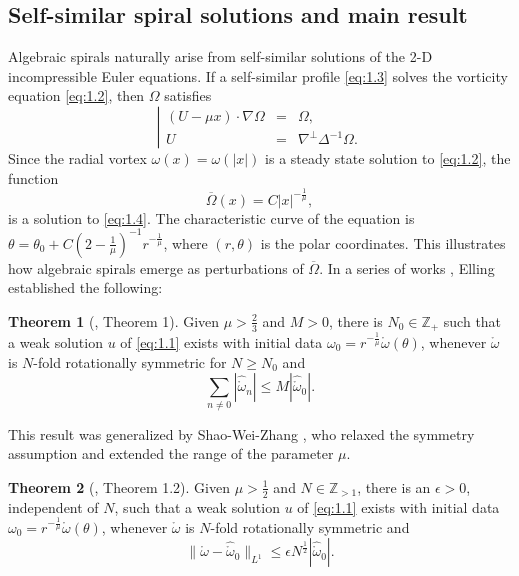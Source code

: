 \documentclass[11pt]{article}
\theoremstyle{definition}
\newtheorem{theorem}{Theorem}[section]
\theoremstyle{remark}
\numberwithin{equation}{section}
\newcommand{\mbb}{\mathbb}
\renewcommand{\hat}{\widehat}
\renewcommand{\bar}{\overline}
\newcommand{\grad}{\nabla}
\newcommand{\norm}[1]{\lVert #1 \rVert}
\begin{document}
\subsection{Self-similar spiral solutions and main result}
Algebraic spirals naturally arise from self-similar solutions of the 2-D incompressible Euler equations. If a self-similar profile \eqref{eq:1.3} solves the vorticity equation \eqref{eq:1.2}, then $\Omega$ satisfies
\begin{equation} \label{eq:1.4}
\left\vert \begin{array}{rcl} (U - \mu x) \cdot \grad \Omega &=& \Omega, \\ U &=&\grad^\perp \Delta^{-1}\Omega. \end{array} \right.
\end{equation}
Since the radial vortex $\omega(x) = \omega(|x|)$ is a steady state solution to \eqref{eq:1.2}, the function
\begin{equation*}
\bar{\Omega}(x) = C |x|^{-\frac{1}{\mu}},
\end{equation*}
is a solution to \eqref{eq:1.4}. The characteristic curve of the equation is $\theta = \theta_0 + C(2 - \frac{1}{\mu})^{-1} r^{-\frac{1}{\mu}}$, where $(r,\theta)$ is the polar coordinates. This illustrates how algebraic spirals emerge as perturbations of $\bar{\Omega}$. In a series of works \cite{Ell13, Ell16}, Elling established the following:

\begin{theorem}[\cite{Ell16}, Theorem 1] \label{thm:1.1}
Given $\mu > \frac{2}{3}$ and $M> 0$, there is $N_0 \in \mbb{Z}_+$ such that a weak solution $u$ of \eqref{eq:1.1} exists with initial data $\omega_0 = r^{-\frac{1}{\mu}} \mathring{\omega}(\theta)$, whenever $\mathring{\omega}$ is $N$-fold rotationally symmetric for $N\geq N_0$ and
\[ \sum_{n\neq 0} |\hat{\mathring{\omega}}_n| \leq M |\hat{\mathring{\omega}}_0|.\]
\end{theorem}

This result was generalized by Shao-Wei-Zhang \cite{SWZ25}, who relaxed the symmetry assumption and extended the range of the parameter $\mu$.

\begin{theorem}[\cite{SWZ25}, Theorem 1.2] \label{thm:1.2}
Given $\mu > \frac{1}{2}$ and $N\in \mbb{Z}_{>1}$, there is an $\epsilon > 0$, independent of $N$, such that a weak solution $u$ of \eqref{eq:1.1} exists with initial data $\omega_0 = r^{-\frac{1}{\mu}} \mathring{\omega}(\theta)$, whenever $\mathring{\omega}$ is $N$-fold rotationally symmetric and
\[\norm{\mathring{\omega} - \hat{\mathring{\omega}}_0}_{L^1} \leq \epsilon N^{\frac{1}{2}} |\hat{\mathring{\omega}}_0|.\]
\end{theorem}
\end{document}

